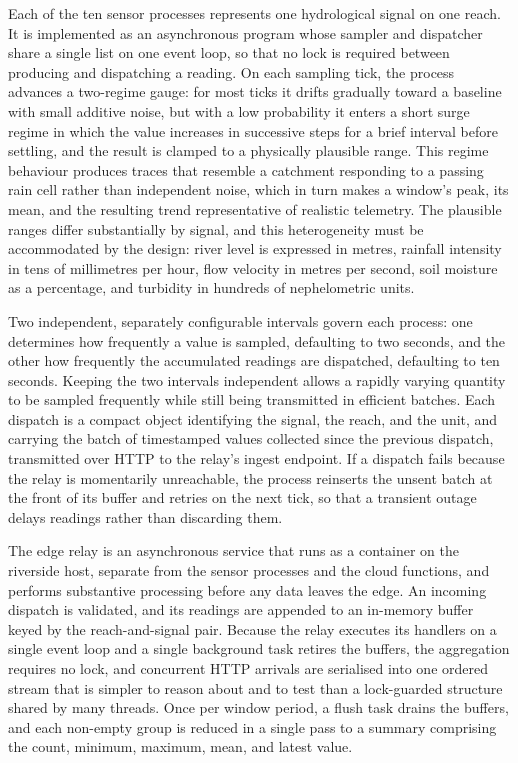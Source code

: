 \documentclass[conference]{IEEEtran}
\begin{document}
Each of the ten sensor processes represents one hydrological signal on one reach. It is implemented as an asynchronous program whose sampler and dispatcher share a single list on one event loop, so that no lock is required between producing and dispatching a reading. On each sampling tick, the process advances a two-regime gauge: for most ticks it drifts gradually toward a baseline with small additive noise, but with a low probability it enters a short surge regime in which the value increases in successive steps for a brief interval before settling, and the result is clamped to a physically plausible range. This regime behaviour produces traces that resemble a catchment responding to a passing rain cell rather than independent noise, which in turn makes a window's peak, its mean, and the resulting trend representative of realistic telemetry. The plausible ranges differ substantially by signal, and this heterogeneity must be accommodated by the design: river level is expressed in metres, rainfall intensity in tens of millimetres per hour, flow velocity in metres per second, soil moisture as a percentage, and turbidity in hundreds of nephelometric units.

Two independent, separately configurable intervals govern each process: one determines how frequently a value is sampled, defaulting to two seconds, and the other how frequently the accumulated readings are dispatched, defaulting to ten seconds. Keeping the two intervals independent allows a rapidly varying quantity to be sampled frequently while still being transmitted in efficient batches. Each dispatch is a compact object identifying the signal, the reach, and the unit, and carrying the batch of timestamped values collected since the previous dispatch, transmitted over HTTP to the relay's ingest endpoint. If a dispatch fails because the relay is momentarily unreachable, the process reinserts the unsent batch at the front of its buffer and retries on the next tick, so that a transient outage delays readings rather than discarding them.

The edge relay is an asynchronous service that runs as a container on the riverside host, separate from the sensor processes and the cloud functions, and performs substantive processing before any data leaves the edge. An incoming dispatch is validated, and its readings are appended to an in-memory buffer keyed by the reach-and-signal pair. Because the relay executes its handlers on a single event loop and a single background task retires the buffers, the aggregation requires no lock, and concurrent HTTP arrivals are serialised into one ordered stream that is simpler to reason about and to test than a lock-guarded structure shared by many threads. Once per window period, a flush task drains the buffers, and each non-empty group is reduced in a single pass to a summary comprising the count, minimum, maximum, mean, and latest value.
\end{document}
